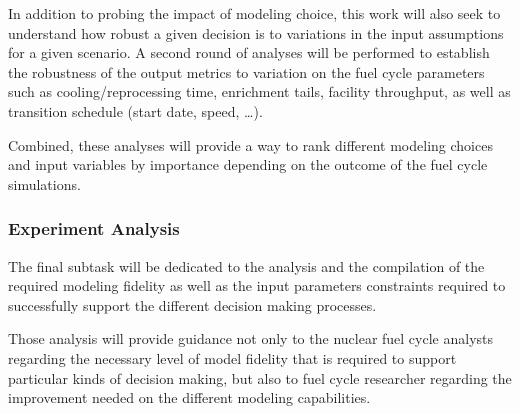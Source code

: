 In addition to probing the impact of modeling choice, this work will also seek
to understand how robust a given decision is to variations in the input
assumptions for a given scenario.  A second round of analyses will be performed
to establish the robustness of the output metrics to variation on the fuel cycle
parameters such as cooling/reprocessing time, enrichment tails, facility
throughput, as well as transition schedule (start date, speed, \dots).

Combined, these analyses will provide a way to rank different modeling choices
and input variables by importance depending on the outcome of the fuel cycle
simulations.

\subsubsection{Experiment Analysis}

The final subtask will be dedicated to the analysis and the compilation of the
required modeling fidelity as well as the input parameters constraints required
to successfully support the different decision making processes.

Those analysis will provide guidance not only to the nuclear fuel cycle analysts
regarding the necessary level of model fidelity that is required to support
particular kinds of decision making, but also to fuel cycle researcher regarding
the improvement needed on the different modeling capabilities.
